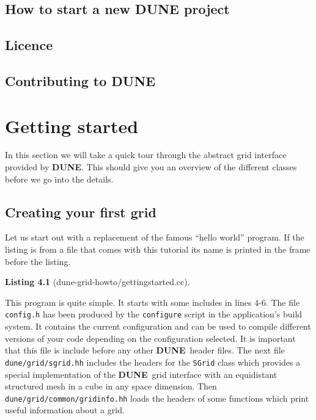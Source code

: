 \documentclass[11pt,a4paper,headinclude,footinclude,DIV14,BCOR8.25mm,titlepage,twoside,openright,normalheadings]{scrreprt}
\newcommand{\Dune}{{\sf\bfseries DUNE}}
\newtheorem{lst}{Listing}
\begin{document}
\section{How to start a new DUNE project}

\section{Licence}

\section{Contributing to DUNE}



\chapter{Getting started}

In this section we will take a quick tour through the abstract
grid interface provided by \Dune. This should give you an overview of
the different classes before we go into the details.

\section{Creating your first grid}

Let us start out with a replacement of the famous ``hello world''
program. If the listing is from a file that comes with this tutorial
its name is printed in the frame before the listing.

\begin{lst}[dune-grid-howto/gettingstarted.cc] \mbox{}


\end{lst}

This program is quite simple. It starts with some includes in lines
4-6. The file \lstinline!config.h! has been produced by the
\lstinline!configure! script in the application's build system. It contains the
current configuration and can be used to compile different versions of
your code depending on the configuration selected. It is important
that this file is include before any other \Dune\ header files. The
next file \lstinline!dune/grid/sgrid.hh! includes the headers for the
\lstinline!SGrid! class which provides a special implementation of the
\Dune\ grid interface with an equidistant structured mesh in a cube in
any space dimension. Then \lstinline!dune/grid/common/gridinfo.hh!
loads the headers of some functions which print useful information
about a grid.
\end{document}
